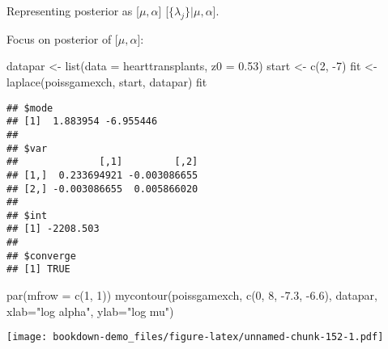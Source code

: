 \documentclass[
]{book}
\newenvironment{Shaded}{\begin{snugshade}}{\end{snugshade}}
\newcommand{\AttributeTok}[1]{\textcolor[rgb]{0.77,0.63,0.00}{#1}}
\newcommand{\DecValTok}[1]{\textcolor[rgb]{0.00,0.00,0.81}{#1}}
\newcommand{\FloatTok}[1]{\textcolor[rgb]{0.00,0.00,0.81}{#1}}
\newcommand{\FunctionTok}[1]{\textcolor[rgb]{0.00,0.00,0.00}{#1}}
\newcommand{\NormalTok}[1]{#1}
\newcommand{\OtherTok}[1]{\textcolor[rgb]{0.56,0.35,0.01}{#1}}
\newcommand{\SpecialCharTok}[1]{\textcolor[rgb]{0.00,0.00,0.00}{#1}}
\newcommand{\StringTok}[1]{\textcolor[rgb]{0.31,0.60,0.02}{#1}}
\begin{document}
Representing posterior as {[}\(\mu, \alpha\){]} {[}\(\{\lambda_j\} | \mu, \alpha\){]}.

Focus on posterior of {[}\(\mu, \alpha\){]}:

\begin{Shaded}
\begin{Highlighting}[]
\NormalTok{datapar }\OtherTok{\textless{}{-}} \FunctionTok{list}\NormalTok{(}\AttributeTok{data =}\NormalTok{ hearttransplants, }\AttributeTok{z0 =} \FloatTok{0.53}\NormalTok{)}
\NormalTok{start }\OtherTok{\textless{}{-}} \FunctionTok{c}\NormalTok{(}\DecValTok{2}\NormalTok{, }\SpecialCharTok{{-}}\DecValTok{7}\NormalTok{)}
\NormalTok{fit }\OtherTok{\textless{}{-}} \FunctionTok{laplace}\NormalTok{(poissgamexch, start, datapar)}
\NormalTok{ fit}
\end{Highlighting}
\end{Shaded}

\begin{verbatim}
## $mode
## [1]  1.883954 -6.955446
## 
## $var
##              [,1]         [,2]
## [1,]  0.233694921 -0.003086655
## [2,] -0.003086655  0.005866020
## 
## $int
## [1] -2208.503
## 
## $converge
## [1] TRUE
\end{verbatim}

\begin{Shaded}
\begin{Highlighting}[]
\FunctionTok{par}\NormalTok{(}\AttributeTok{mfrow =} \FunctionTok{c}\NormalTok{(}\DecValTok{1}\NormalTok{, }\DecValTok{1}\NormalTok{))}
\FunctionTok{mycontour}\NormalTok{(poissgamexch, }\FunctionTok{c}\NormalTok{(}\DecValTok{0}\NormalTok{, }\DecValTok{8}\NormalTok{, }\SpecialCharTok{{-}}\FloatTok{7.3}\NormalTok{, }\SpecialCharTok{{-}}\FloatTok{6.6}\NormalTok{),}
\NormalTok{          datapar,}
          \AttributeTok{xlab=}\StringTok{"log alpha"}\NormalTok{, }\AttributeTok{ylab=}\StringTok{"log mu"}\NormalTok{)}
\end{Highlighting}
\end{Shaded}

\texttt{[image: bookdown-demo\_files/figure-latex/unnamed-chunk-152-1.pdf]}

\begin{Shaded}
\end{Shaded}
\end{document}
